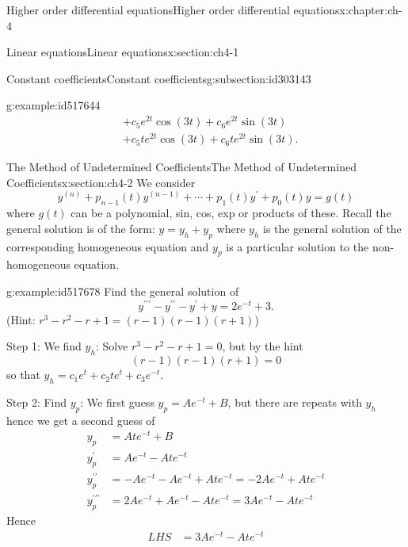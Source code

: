 \documentclass[oneside,10pt,]{book}
\numberwithin{equation}{section}
\numberwithin{equation}{section}
\newcommand{\amp}{&}
\begin{document}
\begin{chapterptx}{Higher order differential equations}{}{Higher order differential equations}{}{}{x:chapter:ch-4}
\begin{sectionptx}{Linear equations}{}{Linear equations}{}{}{x:section:ch4-1}
\begin{subsectionptx}{Constant coefficients}{}{Constant coefficients}{}{}{g:subsection:id303143}
\begin{example}{}{g:example:id517644}
\begin{align*}
\amp +c_{5}e^{2t}\cos(3t)+c_{6}e^{2t}\sin(3t)\\
\amp +c_{5}te^{2t}\cos(3t)+c_{6}te^{2t}\sin(3t).
\end{align*}
%
\end{example}
\end{subsectionptx}
\end{sectionptx}
%
%
\typeout{************************************************}
\typeout{************************************************}
%
\begin{sectionptx}{The Method of Undetermined Coefficients}{}{The Method of Undetermined Coefficients}{}{}{x:section:ch4-2}
We consider%
\begin{equation*}
y^{(n)}+p_{n-1}(t)y^{(n-1)}+\cdots+p_{1}(t)y^{\prime}+p_{0}(t)y=g(t)
\end{equation*}
where \(g(t)\) can be a polynomial, sin, cos, exp or products of these. Recall the general solution is of the form: \(y=y_{h}+y_{p}\) where \(y_{h}\) is the general solution of the corresponding homogeneous equation and \(y_{p}\) is a particular solution to the non-homogeneous equation.%
\begin{example}{}{g:example:id517678}%
Find the general solution of%
\begin{equation*}
y^{\prime\prime\prime}-y^{\prime\prime}-y^{\prime}+y=2e^{-t}+3.
\end{equation*}
(Hint: \(r^{3}-r^{2}-r+1=\left(r-1\right)\left(r-1\right)\left(r+1\right)\))%
\par
Step 1: We find \(y_{h}\): Solve \(r^{3}-r^{2}-r+1=0\), but by the hint%
\begin{equation*}
\left(r-1\right)\left(r-1\right)\left(r+1\right)=0
\end{equation*}
so that \(y_{h}=c_{1}e^{t}+c_{2}te^{t}+c_{3}e^{-t}\).%
\par
Step 2: Find \(y_{p}\): We first guess \(y_{p}=Ae^{-t}+B\), but there are repeats with \(y_{h}\) hence we get a second guess of%
\begin{align*}
y_{p} \amp =Ate^{-t}+B\\
y_{p}^{\prime} \amp =Ae^{-t}-Ate^{-t}\\
y_{p}^{\prime\prime} \amp =-Ae^{-t}-Ae^{-t}+Ate^{-t}=-2Ae^{-t}+Ate^{-t}\\
y_{p}^{\prime\prime\prime} \amp =2Ae^{-t}+Ae^{-t}-Ate^{-t}=3Ae^{-t}-Ate^{-t}
\end{align*}
Hence%
\begin{align*}
LHS \amp =3Ae^{-t}-Ate^{-t}\\

\end{align*}
\end{example}
\end{sectionptx}
\end{chapterptx}
\end{document}
